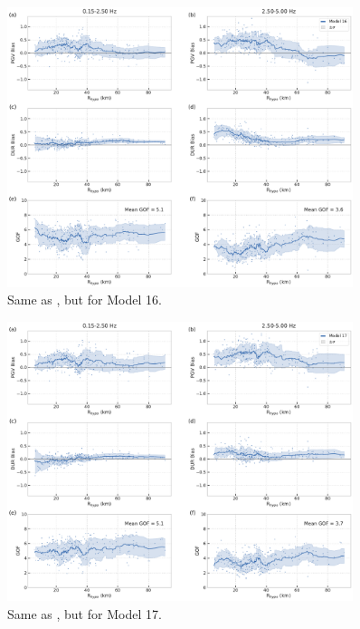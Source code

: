 \begin{figure}[!ht]
  \centering
  \includegraphics[width=0.9\textwidth,height=0.9\textheight,keepaspectratio]{figures/figure_highf_S26.pdf}
  \caption{Same as , but for Model 16.
  }
\label{fig:highf-A26}
\end{figure}
\clearpage


\begin{figure}[!ht]
  \centering
  \includegraphics[width=0.9\textwidth,height=0.9\textheight,keepaspectratio]{figures/figure_highf_S27.pdf}
  \caption{Same as , but for Model 17.
  }
\label{fig:highf-A27}
\end{figure}
\clearpage


